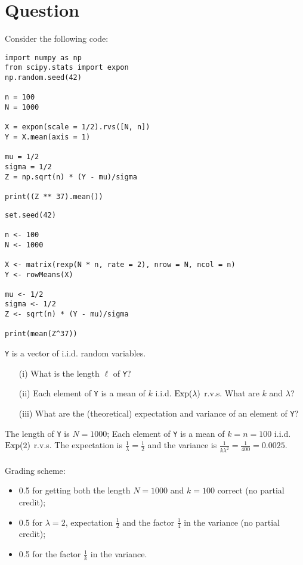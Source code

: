 \section*{Question}

Consider the following code:

\begin{verbatim}
import numpy as np
from scipy.stats import expon
np.random.seed(42)

n = 100
N = 1000

X = expon(scale = 1/2).rvs([N, n])
Y = X.mean(axis = 1)

mu = 1/2
sigma = 1/2
Z = np.sqrt(n) * (Y - mu)/sigma

print((Z ** 37).mean())
\end{verbatim}

\begin{verbatim}
set.seed(42)

n <- 100
N <- 1000

X <- matrix(rexp(N * n, rate = 2), nrow = N, ncol = n)
Y <- rowMeans(X)

mu <- 1/2
sigma <- 1/2
Z <- sqrt(n) * (Y - mu)/sigma

print(mean(Z^37))
\end{verbatim}

\vspace*{20pt}


\begin{exercise}[1.5]
\texttt{Y} is a vector of i.i.d. random variables.

\begin{itemize}
\item[(i)] What is the length $\ell$ of \texttt{Y}?
\item[(ii)] Each element of \texttt{Y} is a mean of $k$ i.i.d. $\mathrm{Exp}(\lambda)$ r.v.s.
What are $k$ and $\lambda$?  
\item[(iii)] What are the (theoretical) expectation and variance of an element of \texttt{Y}? 
\end{itemize} 

\begin{solution}
The length of \texttt{Y} is $N = 1000$;  Each element of \texttt{Y} is a mean of $k = n = 100$ i.i.d. $\mathrm{Exp}(2)$ r.v.s.
The expectation is $\frac1\lambda = \frac12$ and the variance is $\frac1{k \lambda^2} = \frac1{400} = 0.0025$. \\ \\
Grading scheme:
\begin{itemize}
\item 0.5 for getting both the length $N=1000$ and  $k=100$ correct (no partial credit);
\item 0.5 for $\lambda = 2$, expectation $\frac12$ and the factor $\frac14$ in the variance (no partial credit);
\item 0.5 for the factor $\frac1{k}$ in the variance.
\end{itemize}
\end{solution}
\end{exercise}

